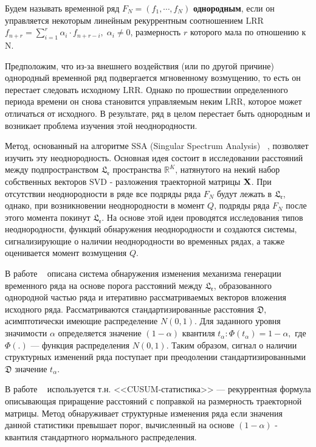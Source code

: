 \documentclass[specialist, substylefile = spbu.rtx,
			   subf, href, 12pt]{disser}
\begin{document}
\newpage
\tableofcontents
\newpage

\intro
Будем называть временной ряд $F_N = (f_1, \cdots, f_{N})$ \textbf{однородным}, если он управляется некоторым линейным рекуррентным соотношением $\mathrm{LRR}$ $f_{n+r} = \sum_{i=1}^{r} \alpha_i\cdot f_{n+r-i}, \; \alpha_i \neq 0$, размерность $ r $ которого мала по отношению к $\mathrm{N}$. 

Предположим, что из-за внешнего воздействия (или по другой причине) однородный временной ряд подвергается мгновенному возмущению, то есть он перестает следовать исходному $\mathrm{LRR}$. Однако по прошествии определенного периода времени он снова становится управляемым неким $\mathrm{LRR}$, которое может отличаться от исходного. В результате, ряд в целом перестает быть однородным и возникает проблема изучения этой неоднородности.

Метод, основанный на алгоритме $ \mathrm{SSA} $ (Singular Spectrum Analysis) ~\cite{Golyandina2001, Moskvina2010ChangeP, CPD}, позволяет изучить эту неоднородность. Основная идея состоит в исследовании расстояний между подпространством $ \mathfrak{L_r} $ пространства $ \mathbb{R}^K $, натянутого на некий набор собственных векторов $ \mathrm{SVD} $ - разложения траекторной матрицы $ \bold{X} $. При отсутствии неоднородности в ряде все подряды ряда $ F_N $ будут лежать в $ \mathfrak{L_r} $, однако, при возникновении неоднородности в момент $ Q $, подряды ряда $ F_N $ после этого момента покинут $ \mathfrak{L_r} $. На основе этой идеи проводятся исследования типов неоднородности, функций обнаружения неоднородности и создаются системы, сигнализирующие о наличии неоднородности во временных рядах, а также оценивается момент возмущения $ Q $.

В работе ~\cite{Moskvina2010ChangeP} описана система обнаружения изменения механизма генерации временного ряда на основе порога расстояний между $ \mathfrak{L_r} $, образованного однородной частью ряда и итеративно рассматриваемых векторов вложения исходного ряда. Рассматриваются стандартизированные расстояния $ \mathfrak{D} $, асимптотически имеющие распределение $ N(0, 1)$. Для заданного уровня значимости $ \alpha $ определяется значение $ (1-\alpha) $ квантиля $ t_\alpha: \Phi(t_\alpha) = 1 - \alpha, $ где $ \Phi(.) $ --- функция распределения $ N(0, 1) $. Таким образом, сигнал о наличии структурных изменений ряда поступает при преодолении стандартизированными $ \mathfrak{D} $ значение $ t_\alpha $. 

В работе ~\cite{CPD} используется т.н. <<CUSUM-статистика>> --- рекуррентная формула описывающая приращение расстояний с поправкой на размерность траекторной матрицы. Метод обнаруживает структурные изменения ряда если значения данной статистики превышает порог, вычисленный на основе $ (1 - \alpha) $ - квантиля стандартного нормального распределения.
\end{document}
